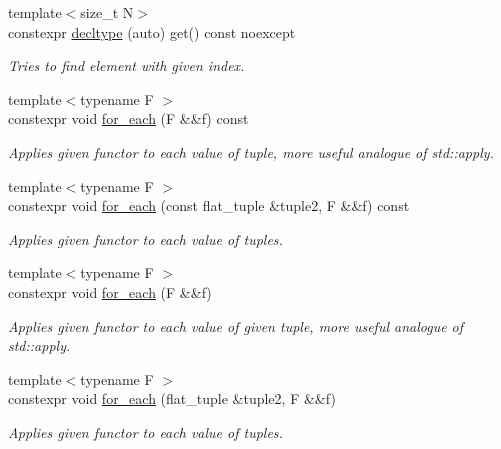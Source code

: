 \begin{CompactItemize}
{\footnotesize template$<$size\_\-t N$>$ }\\constexpr \hyperlink{classhope_1_1detail_1_1flat__tuple__impl_3_01std_1_1index__sequence_3_01_is_8_8_8_4_00_01_ts_8_8_8_4_0db8adfa32e775efc297ffd41fdda6a7}{decltype} (auto) get() const noexcept
\begin{CompactList}\small\item\em Tries to find element with given index. \item\end{CompactList}\item 
{\footnotesize template$<$typename F $>$ }\\constexpr void \hyperlink{classhope_1_1detail_1_1flat__tuple__impl_3_01std_1_1index__sequence_3_01_is_8_8_8_4_00_01_ts_8_8_8_4_666a36927404ca2f5d9faeeb9da9c039}{for\_\-each} (F \&\&f) const 
\begin{CompactList}\small\item\em Applies given functor to each value of tuple, more useful analogue of std::apply. \item\end{CompactList}\item 
{\footnotesize template$<$typename F $>$ }\\constexpr void \hyperlink{classhope_1_1detail_1_1flat__tuple__impl_3_01std_1_1index__sequence_3_01_is_8_8_8_4_00_01_ts_8_8_8_4_217b9226418ab5ac765404e6632a8083}{for\_\-each} (const flat\_\-tuple \&tuple2, F \&\&f) const 
\begin{CompactList}\small\item\em Applies given functor to each value of tuples. \item\end{CompactList}\item 
{\footnotesize template$<$typename F $>$ }\\constexpr void \hyperlink{classhope_1_1detail_1_1flat__tuple__impl_3_01std_1_1index__sequence_3_01_is_8_8_8_4_00_01_ts_8_8_8_4_1ef2389962afceff73d54483975f5628}{for\_\-each} (F \&\&f)
\begin{CompactList}\small\item\em Applies given functor to each value of given tuple, more useful analogue of std::apply. \item\end{CompactList}\item 
{\footnotesize template$<$typename F $>$ }\\constexpr void \hyperlink{classhope_1_1detail_1_1flat__tuple__impl_3_01std_1_1index__sequence_3_01_is_8_8_8_4_00_01_ts_8_8_8_4_90c90aefa83c884fc686a98175d8fcd6}{for\_\-each} (flat\_\-tuple \&tuple2, F \&\&f)
\begin{CompactList}\small\item\em Applies given functor to each value of tuples. \item\end{CompactList}\end{CompactItemize}
